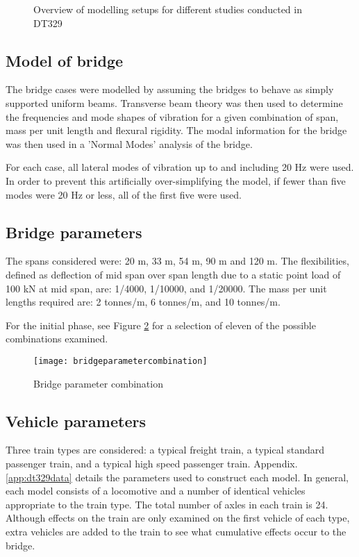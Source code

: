 \begin{appendices}
\begin{figure}[h]

\caption{Overview of modelling setups for different studies conducted in DT329 }
\label{fig:modelling overview}
\end{figure}


\subsection{Model of bridge}
The bridge cases were modelled by assuming the bridges to behave as simply supported uniform beams. Transverse beam theory was then used to determine the frequencies and mode shapes of vibration for a given combination of span, mass per unit length and flexural rigidity. The modal information for the bridge was then used in a 'Normal Modes' analysis of the bridge.

For each case, all lateral modes of vibration up to and including 20 Hz were used. In order to prevent this artificially over-simplifying the model, if fewer than five modes were 20 Hz or less, all of the first five were used.

\subsection{Bridge parameters}

The spans considered were: 20 m, 33 m, 54 m, 90 m and 120 m. The flexibilities, defined as deflection of mid span over span length due to a static point load of 100 kN at mid span, are: 1/4000, 1/10000, and 1/20000. The mass per unit lengths required are: 2 tonnes/m, 6 tonnes/m, and 10 tonnes/m.

For the initial phase, see Figure \ref{fig:bridgeparametercombination} for a selection of eleven of the possible combinations examined.

\begin{figure}[h]
    \centering
    \texttt{[image: bridgeparametercombination]}
    \caption{Bridge parameter combination}
    \label{fig:bridgeparametercombination}
\end{figure}

\subsection{Vehicle parameters}
Three train types are considered: a typical freight train, a typical standard passenger train, and a typical high speed passenger train. Appendix.\ref{app:dt329data} details the parameters used to construct each model. In general, each model consists of a locomotive and a number of identical vehicles appropriate to the train type. The total number of axles in each train is 24. Although effects on the train are only examined on the first vehicle of each type, extra vehicles are added to the train to see what cumulative effects occur to the bridge.


\end{appendices}
